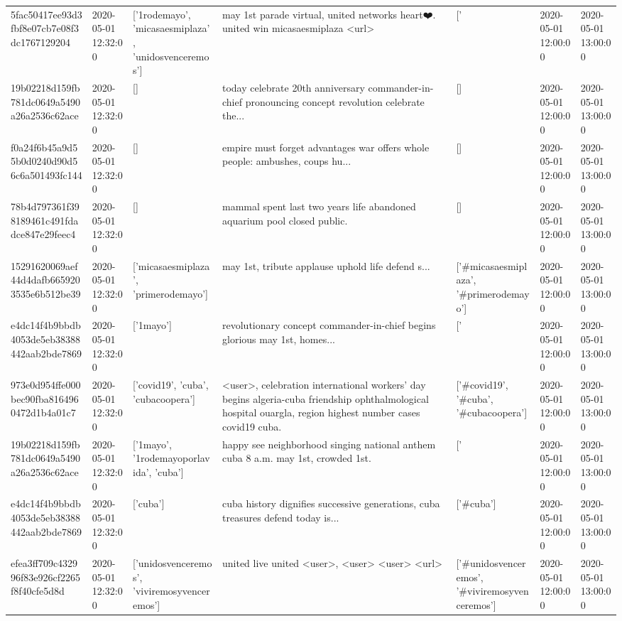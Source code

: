 \begin{tabular}{lllllll}
5fac50417ee93d3fbf8e07cb7e08f3dc1767129204 & 2020-05-01 12:32:00 & ['1rodemayo', 'micasaesmiplaza', 'unidosvenceremos'] & may 1st parade virtual, united networks heart❤️. united win micasaesmiplaza <url> & ['#1rodemayo', '#micasaesmiplaza', '#unidosvenceremos'] & 2020-05-01 12:00:00 & 2020-05-01 13:00:00 \\
19b02218d159fb781dc0649a5490a26a2536c62ace & 2020-05-01 12:32:00 & [] & today celebrate 20th anniversary commander-in-chief pronouncing concept revolution celebrate the... & [] & 2020-05-01 12:00:00 & 2020-05-01 13:00:00 \\
f0a24f6b45a9d55b0d0240d90d56c6a501493fc144 & 2020-05-01 12:32:00 & [] & empire must forget advantages war offers whole people: ambushes, coups hu... & [] & 2020-05-01 12:00:00 & 2020-05-01 13:00:00 \\
78b4d797361f398189461c491fdadce847e29feec4 & 2020-05-01 12:32:00 & [] & mammal spent last two years life abandoned aquarium pool closed public. & [] & 2020-05-01 12:00:00 & 2020-05-01 13:00:00 \\
15291620069aef44d4dafb6659203535e6b512be39 & 2020-05-01 12:32:00 & ['micasaesmiplaza', 'primerodemayo'] & may 1st, tribute applause uphold life defend s... & ['#micasaesmiplaza', '#primerodemayo'] & 2020-05-01 12:00:00 & 2020-05-01 13:00:00 \\
e4dc14f4b9bbdb4053de5eb38388442aab2bde7869 & 2020-05-01 12:32:00 & ['1mayo'] & revolutionary concept commander-in-chief begins glorious may 1st, homes... & ['#1mayo'] & 2020-05-01 12:00:00 & 2020-05-01 13:00:00 \\
973e0d954ffe000bec90fba8164960472d1b4a01c7 & 2020-05-01 12:32:00 & ['covid19', 'cuba', 'cubacoopera'] & <user>, celebration international workers' day begins algeria-cuba friendship ophthalmological hospital ouargla, region highest number cases covid19 cuba. & ['#covid19', '#cuba', '#cubacoopera'] & 2020-05-01 12:00:00 & 2020-05-01 13:00:00 \\
19b02218d159fb781dc0649a5490a26a2536c62ace & 2020-05-01 12:32:00 & ['1mayo', '1rodemayoporlavida', 'cuba'] & happy see neighborhood singing national anthem cuba 8 a.m. may 1st, crowded 1st. & ['#1mayo', '#1rodemayoporlavida', '#cuba'] & 2020-05-01 12:00:00 & 2020-05-01 13:00:00 \\
e4dc14f4b9bbdb4053de5eb38388442aab2bde7869 & 2020-05-01 12:32:00 & ['cuba'] & cuba history dignifies successive generations, cuba treasures defend today is... & ['#cuba'] & 2020-05-01 12:00:00 & 2020-05-01 13:00:00 \\
efea3ff709c432996f83e926cf2265f8f40cfe5d8d & 2020-05-01 12:32:00 & ['unidosvenceremos', 'viviremosyvenceremos'] & united live united <user>, <user> <user> <url> & ['#unidosvenceremos', '#viviremosyvenceremos'] & 2020-05-01 12:00:00 & 2020-05-01 13:00:00 \\

\end{tabular}
